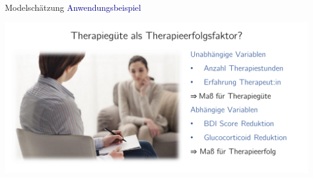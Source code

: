 \documentclass[
  8pt,
  ignorenonframetext,
]{beamer}
\begin{document}
\begin{frame}{Modelschätzung}
\protect\hypertarget{modelschuxe4tzung}{}
\textcolor{darkblue}{Anwendungsbeispiel} \vspace{3mm}

\begin{center}\includegraphics[width=1\linewidth]{7_Abbildungen/mvda_7_beispielszenario_kanonische_korrelation} \end{center}
\end{frame}
\end{document}

